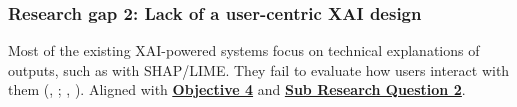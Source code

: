
\subsubsection*{Research gap 2: Lack of a user-centric XAI design}\label{research-gap-2}
Most of the existing XAI-powered systems focus on technical explanations of outputs, such as with SHAP/LIME. They fail to evaluate how users interact with them (\citeauthor{vo2024securing}, \citeyear{vo2024securing}; \citeauthor{anderson2015polymorphic}, \citeyear{anderson2015polymorphic}). Aligned with \hyperref[objective-4]{\uline{\textbf{Objective 4}}} and \hyperref[sub-research-q2]{\uline{\textbf{Sub Research Question 2}}}.

